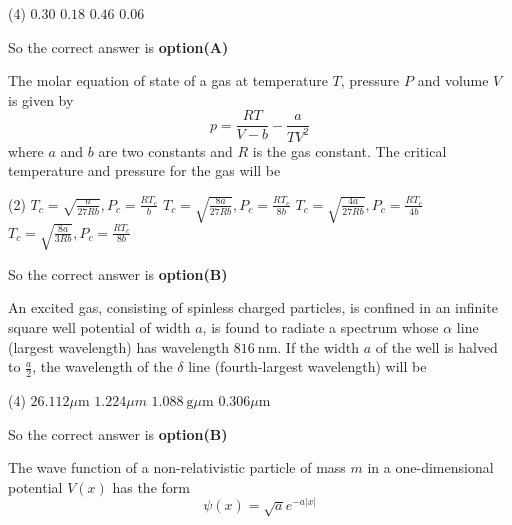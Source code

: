\begin{questions}
\begin{minipage}{\textwidth}
\end{minipage}
\begin{tasks}(4)
	\task[\textbf{A.}] $0.30$
	\task[\textbf{B.}] $0.18$
	\task[\textbf{C.}] $0.46$
	\task[\textbf{D.}] $0.06$
\end{tasks}
\begin{answer}
	So the correct answer is \textbf{option(A)}
\end{answer}
\begin{minipage}{\textwidth}
	\question The molar equation of state of a gas at temperature $T$, pressure $P$ and volume $V$ is given by
	$$
	p=\frac{R T}{V-b}-\frac{a}{T V^{2}}
	$$
	where $a$ and $b$ are two constants and $R$ is the gas constant. The critical temperature and pressure for the gas will be
\end{minipage}
\begin{tasks}(2)
	\task[\textbf{A.}] $T_{c}=\sqrt{\frac{a}{27 R b}}, P_{c}=\frac{R T_{c}}{b}$
	\task[\textbf{B.}] $T_{c}=\sqrt{\frac{8 a}{27 R b}}, P_{c}=\frac{R T_{c}}{8 b}$
	\task[\textbf{C.}] $T_{c}=\sqrt{\frac{4 a}{27 R b}}, P_{c}=\frac{R T_{c}}{4 b}$
	\task[\textbf{D.}] $T_{c}=\sqrt{\frac{8 a}{3 R b}}, P_{c}=\frac{R T_{c}}{8 b}$
\end{tasks}
\begin{answer}
	So the correct answer is \textbf{option(B)}
\end{answer}
\begin{minipage}{\textwidth}
	\question An excited gas, consisting of spinless charged particles, is confined in an infinite square well potential of width $a$, is found to radiate a spectrum whose $\alpha$ line (largest wavelength) has wavelength $816 \mathrm{~nm}$. If the width $a$ of the well is halved to $\frac{a}{2}$, the wavelength of the $\delta$ line (fourth-largest wavelength) will be
\end{minipage}
\begin{tasks}(4)
	\task[\textbf{A.}] $26.112 \mu \mathrm{m}$
	\task[\textbf{B.}] $1.224 \mu m$
	\task[\textbf{C.}] $1.088 \mathrm{~g} \mu \mathrm{m}$
	\task[\textbf{D.}] $0.306 \mu \mathrm{m}$
\end{tasks}
\begin{answer}
	So the correct answer is \textbf{option(B)}
\end{answer}
\begin{minipage}{\textwidth}
	\question The wave function of a non-relativistic particle of mass $m$ in a one-dimensional potential $V(x)$ has the form
	$$
	\psi(x)=\sqrt{a} e^{-a|x|}
$$
\end{minipage}
\end{questions}
